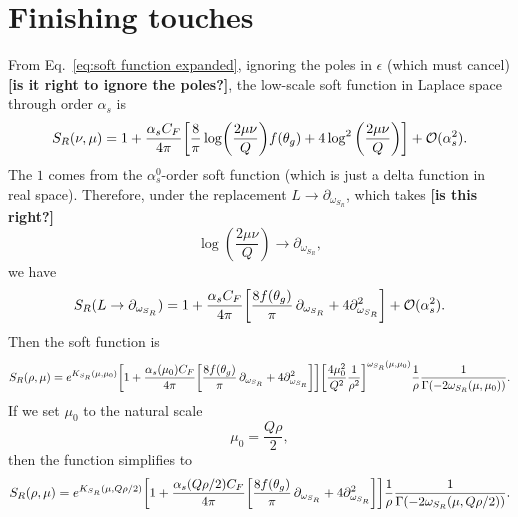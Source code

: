 \documentclass[11pt,twoside,reqno]{amsart}
\theoremstyle{plain}
\theoremstyle{remark}
\theoremstyle{definition}
\theoremstyle{remark}
\theoremstyle{definition}
\theoremstyle{definition}
\newcommand{\cO}{\mathcal{O}}
\begin{document}
\section{Finishing touches}
	From Eq.~\ref{eq:soft function expanded}, ignoring the poles in $\epsilon$ (which must cancel) {\color{red}\textbf{[is it right to ignore the poles?]}}, the low-scale soft function in Laplace space through order $\alpha_s$ is
	\begin{equation}
		S_R(\nu, \mu) = 1 + \frac{\alpha_s C_F}{4\pi}\qty[\frac{8}{\pi}\log(\frac{2\mu\nu}{Q})f(\theta_g) + 4\log^2\qty(\frac{2\mu\nu}{Q})] + \cO(\alpha_s^2).
	\end{equation}
	The $1$ comes from the $\alpha_s^0$-order soft function (which is just a delta function in real space). Therefore, under the replacement $L \to \partial_{\omega_{S_R}}$, which takes {\color{red}\textbf{[is this right?]}}
	\begin{equation}
		\log(\frac{2\mu\nu}{Q}) \to \partial_{\omega_{S_R}},
	\end{equation}
	we have
	\begin{equation}
		S_R(L \to \partial_{\omega_{S_R}}) = 1 + \frac{\alpha_s C_F}{4\pi}\qty[\frac{8f(\theta_g)}{\pi}\,\partial_{\omega_{S_R}} + 4\partial^2_{\omega_{S_R}}] + \cO(\alpha_s^2).
	\end{equation}
	Then the soft function is
	\begin{equation}
		S_R(\rho, \mu) = e^{K_{S_R}(\mu, \mu_0)} \qty[1 + \frac{\alpha_s(\mu_0) C_F}{4\pi}\qty[\frac{8f(\theta_g)}{\pi}\,\partial_{\omega_{S_R}} + 4\partial^2_{\omega_{S_R}}]] \qty[\frac{4\mu_0^2}{Q^2}\frac{1}{\rho^2}]^{\omega_{S_R}(\mu, \mu_0)} \frac{1}{\rho} \frac{1}{\Gamma(-2\omega_{S_R}(\mu, \mu_0))}.
	\end{equation}
	If we set $\mu_0$ to the natural scale
	\begin{equation}
		\mu_0 = \frac{Q\rho}{2},
	\end{equation}
	then the function simplifies to
	\begin{equation}
		S_R(\rho, \mu) = e^{K_{S_R}(\mu, Q\rho /2)} \qty[1 + \frac{\alpha_s(Q\rho/2) C_F}{4\pi}\qty[\frac{8f(\theta_g)}{\pi}\,\partial_{\omega_{S_R}} + 4\partial^2_{\omega_{S_R}}]] \frac{1}{\rho} \frac{1}{\Gamma(-2\omega_{S_R}(\mu, Q\rho/2))}.
	\end{equation}




\end{document}
